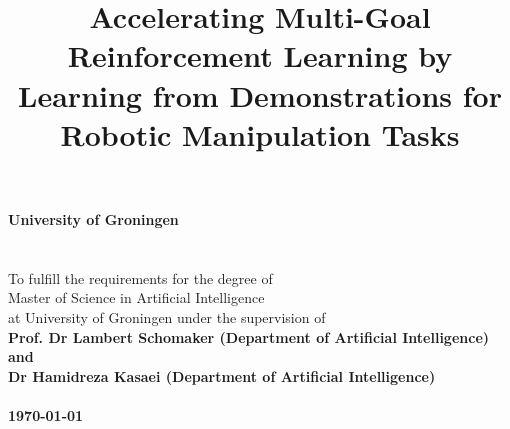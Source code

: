 \documentclass[a4paper,12pt,twoside]{article}
\begin{document}
\pagestyle{body}


\title{
    \vspace{5cm}
        {\bf
        {\Huge Accelerating Multi-Goal  \\
        \vspace{2mm} Reinforcement Learning by  \\
        \vspace{2mm} Learning from Demonstrations for \\
        \vspace{4mm} Robotic Manipulation Tasks}} \\
        \vspace{10cm}{\LARGE Hari Vidharth}
}
\date{}

\maketitle
\thispagestyle{titlepage}


\newpage

\thispagestyle{titlepage}

\vspace*{4cm}

\begin{center}
    {\bf{\large University of Groningen}} \\

     \\

    \vspace{1cm}{\bf Master's Thesis} \\

    \vspace{1cm}To fulfill the requirements for the degree of \\
    Master of Science in Artificial Intelligence \\
    at University of Groningen under the supervision of \\

    \bf{Prof. Dr Lambert Schomaker (Department of Artificial Intelligence)} \\
    and \\
    \bf{Dr Hamidreza Kasaei (Department of Artificial Intelligence)} \\

     \\

    \vspace{7cm}\today
\end{center}
\end{document}
